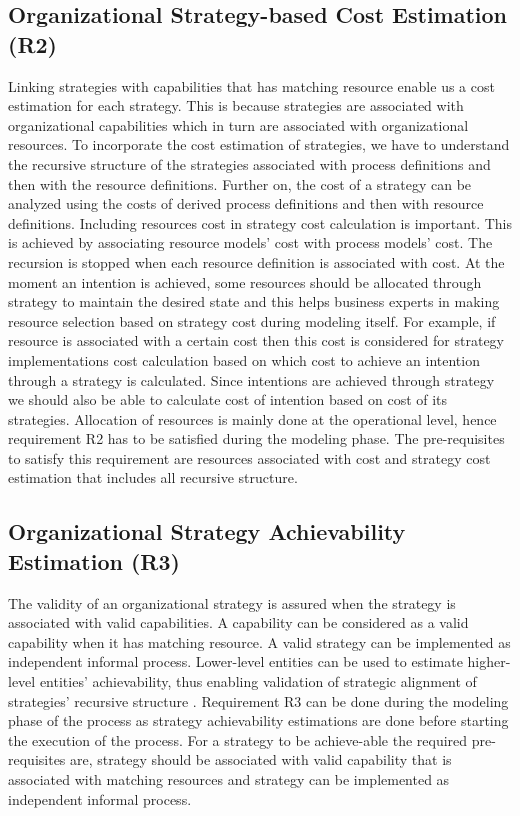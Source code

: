 \subsection{Organizational Strategy-based Cost Estimation (R2)}
Linking strategies with capabilities that has matching resource enable us a cost estimation for each strategy. This is because strategies are associated with organizational capabilities which in turn are associated with organizational resources. To incorporate the cost estimation of strategies, we have to understand the recursive structure of the strategies associated with process definitions and then with the resource definitions. Further on, the cost of a strategy can be analyzed using the costs of derived process definitions and then with resource definitions. Including resources cost in strategy cost calculation is important. This is achieved by associating resource models' cost with process models' cost. The recursion is stopped when each resource definition is associated with cost. At the moment an intention is achieved, some resources should be allocated through strategy to maintain the desired state \cite{Mandic2010} and this helps business experts in making resource selection based on strategy cost during modeling itself. For example, if resource is associated with a certain cost then this cost is considered for strategy implementations cost calculation based on which cost to achieve an intention through a strategy is calculated. Since intentions are achieved through strategy we should also be able to calculate cost of intention based on cost of its strategies. Allocation of resources is mainly done at the operational level, hence requirement R2 has to be satisfied during the modeling phase. The pre-requisites to satisfy this requirement are resources associated with cost and strategy cost estimation that includes all recursive structure.

\subsection{Organizational Strategy Achievability Estimation (R3)}
 The validity of an organizational strategy is assured when the strategy is associated with valid capabilities. A capability can be considered as a valid capability when it has matching resource. A valid strategy can be implemented as independent informal process. Lower-level entities can be used to estimate higher-level entities' achievability, thus enabling validation of strategic alignment of strategies' recursive structure \cite{Bleistein2006}. Requirement R3  can be done during the modeling phase of the process as strategy achievability estimations are done before starting the execution of the process. For a strategy to be achieve-able the required pre-requisites are, strategy should be associated with valid capability that is associated with matching resources and strategy can be implemented as independent informal process.
 
